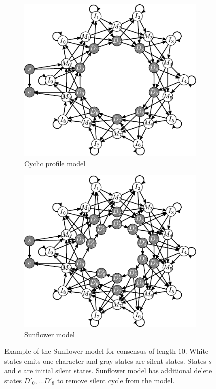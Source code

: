 \begin{figure}
\begin{center}
\begin{subfigure}[b]{0.5\textwidth}
\includegraphics{../figures/SunflowerSilentCircle.pdf}
\caption{Cyclic profile model}\label{SUBFIGURE:SUNFLOWERSILENTCYCLE}
\end{subfigure}%
\begin{subfigure}[b]{0.5\textwidth}
\includegraphics{../figures/Sunflower.pdf}
\caption{Sunflower model}\label{SUBFIGURE:SUNFLOWER}
\end{subfigure}
\end{center}
\caption[Example of the Sunflower model]{Example of the Sunflower model for
consensus of length $10$. White states emits one character and gray states are
silent states. States $s$ and $e$ are initial silent states. Sunflower model
has additional delete states $D'_0, \dots D'_8$ to remove silent cycle from the
model.}
\label{FIGURE:SUNFLOWERMODEL}
\end{figure}

